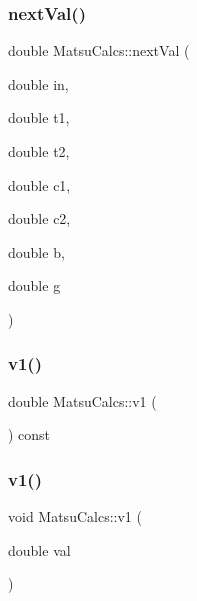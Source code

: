 \subsubsection{\texorpdfstring{next\+Val()}{nextVal()}}
{\footnotesize\ttfamily double Matsu\+Calcs\+::next\+Val (\begin{DoxyParamCaption}\item[{double}]{in,  }\item[{double}]{t1,  }\item[{double}]{t2,  }\item[{double}]{c1,  }\item[{double}]{c2,  }\item[{double}]{b,  }\item[{double}]{g }\end{DoxyParamCaption})}

\mbox{\label{classMatsuCalcs_ae9deb8038e91c5cab82f1bbc808d1cc3}} 
\subsubsection{\texorpdfstring{v1()}{v1()}\hspace{0.1cm}{\footnotesize\ttfamily [1/2]}}
{\footnotesize\ttfamily double Matsu\+Calcs\+::v1 (\begin{DoxyParamCaption}{ }\end{DoxyParamCaption}) const\hspace{0.3cm}{\ttfamily [inline]}}

\mbox{\label{classMatsuCalcs_a09616bb8736d0de547f77cde66cb0050}} 
\subsubsection{\texorpdfstring{v1()}{v1()}\hspace{0.1cm}{\footnotesize\ttfamily [2/2]}}
{\footnotesize\ttfamily void Matsu\+Calcs\+::v1 (\begin{DoxyParamCaption}\item[{double}]{val }\end{DoxyParamCaption})\hspace{0.3cm}{\ttfamily [inline]}}

\mbox{\label{classMatsuCalcs_a82af7633b9cbcc8143045f3e8e26ba18}} 
